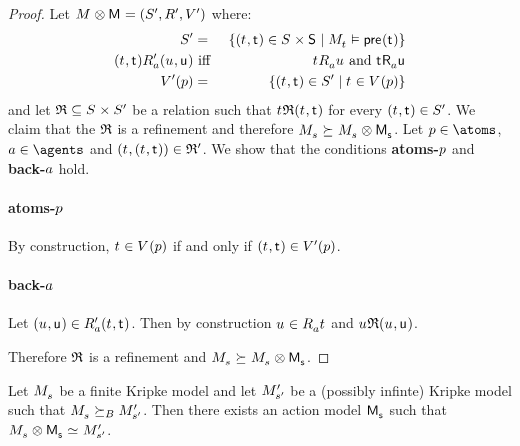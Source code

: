 \begin{proof}
Let $\kModel \exec \aModel = \kModelTupleP$ where:
\begin{eqnarray*}
    \kStatesP &=& \{(\kStateT, \aStateT) \in \kStates \times \aStates \mid \kPModel{\kStateT} \entails \aPrecondition(\aStateT)\}\\
    (\kStateT, \aStateT) \kAccessibilityPA (\kStateU, \aStateU) &\text{ iff }& \kStateT \kAccessibilityA \kStateU \text{ and } \aStateT \aAccessibilityA \aStateU\\
    \kValuationP(\atomP) &=& \{(\kStateT, \aStateT) \in \kStatesP \mid \kStateT \in \kValuation(\atomP)\}
\end{eqnarray*}
and let $\refinement \subseteq \kStates \times \kStatesP$ be a relation such that $\kStateT \refinement (\kStateT, \aStateT)$ for every $(\kStateT, \aStateT) \in \kStatesP$.
We claim that the $\mathfrak{R}$ is a refinement and therefore $\kPModel{\kStateS} \simulates \kPModel{\kStateS} \exec \aPModel{\aStateS}$.
Let $\atomP \in \atoms$, $\agentA \in \agents$ and $(\kStateT, (\kStateT, \aStateT)) \in \refinement'$.
We show that the conditions {\bf atoms-$p$} and {\bf back-$a$} hold.

\paragraph{atoms-$p$}
By construction, $\kStateT \in \kValuation(\atomP)$ if and only if $(\kStateT, \aStateT) \in \kValuationP(\atomP)$.

\paragraph{back-$a$}
Let $(\kStateU, \aStateU) \in \kAccessibilityPA{(\kStateT, \aStateT)}$.
Then by construction $\kStateU \in \kAccessibilityA{\kStateT}$ and $\kStateU \refinement (\kStateU, \aStateU)$.

Therefore $\mathfrak{R}$ is a refinement and $\kPModel{\kStateS} \simulates \kPModel{\kStateS} \exec \aPModel{\aStateS}$.
\end{proof}

\begin{proposition}
Let $\kPModel{\kStateS}$ be a finite Kripke model and let ${M^{\prime}_{{{s}^{\prime}}}}$ be a (possibly infinte) Kripke model such that $\kPModel{\kStateS} \simulatesBs \kPModelP{\kStateSP}$.
Then there exists an action model $\aPModel{\aStateS}$ such that $\kPModel{\kStateS} \exec \aPModel{\aStateS} \bisimilar \kPModelP{\kStateSP}$.
\end{proposition}

